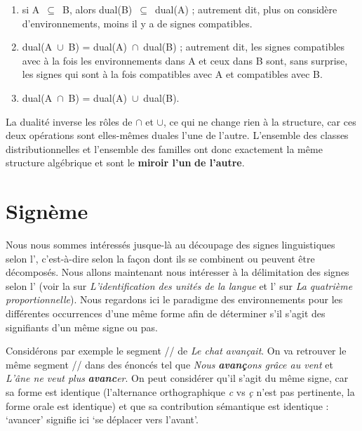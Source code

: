 {    \begin{enumerate}
    \item  si A~\textrm{${\subseteq}$}~B, alors dual(B)~\textrm{${\subseteq}$}~dual(A) ; autrement dit, plus on considère d’environnements, moins il y a de signes compatibles.
    \item  dual(A~\textrm{${\cup}$}~B) = dual(A)~\textrm{${\cap}$}~dual(B) ; autrement dit, les signes compatibles avec à la fois les environnements dans A et ceux dans B sont, sans surprise, les signes qui sont à la fois compatibles avec A et compatibles avec B.
    \item dual(A~\textrm{${\cap}$}~B) = dual(A)~\textrm{${\cup}$}~dual(B).
    \end{enumerate}

    La dualité inverse les rôles de \textrm{${\cap}$} et \textrm{${\cup}$}, ce qui ne change rien à la structure, car ces deux opérations sont elles-mêmes duales l’une de l’autre. L’ensemble des classes distributionnelles et l’ensemble des familles ont donc exactement la même structure algébrique et sont le \textbf{miroir l’un} \textbf{de l’autre}.
}
\section{Signème}\label{sec:2.2.9}

Nous nous sommes intéressés jusque-là au découpage des signes linguistiques selon l’, c’est-à-dire selon la façon dont ils se combinent ou peuvent être décomposés. Nous allons maintenant nous intéresser à la délimitation des signes selon l’ (voir la  sur \textit{L’identification des unités de la langue} et l’ sur \textit{La quatrième proportionnelle}). Nous regardons ici le paradigme des environnements pour les différentes occurrences d’une même forme afin de déterminer s’il s’agit des signifiants d’un même signe ou pas.

Considérons par exemple le segment // de \textit{Le chat avançait}. On va retrouver le même segment // dans des énoncés tel que \textit{Nous} \textbf{\textit{avanç}}\textit{ons grâce au vent} et \textit{L’âne ne veut plus} \textbf{\textit{avanc}}\textit{er}. On peut considérer qu’il s’agit du même signe, car sa forme est identique (l’alternance orthographique \textit{c} vs \textit{ç} n’est pas pertinente, la forme orale est identique) et que sa contribution sémantique est identique : ‘avancer’ signifie ici ‘se déplacer vers l’avant’.

